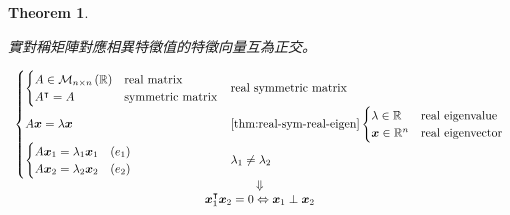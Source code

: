 \documentclass[
]{book}
\newtheorem{theorem}{Theorem}[chapter]
\theoremstyle{definition}
\theoremstyle{definition}
\theoremstyle{definition}
\theoremstyle{definition}
\theoremstyle{remark}
\begin{document}
\begin{theorem}
\protect\hypertarget{thm:unnamed-chunk-4}{}\label{thm:unnamed-chunk-4}\leavevmode

\begin{CJK}{UTF8}{bsmi}
實對稱矩陣對應相異特徵值的特徵向量互為正交。
\end{CJK}

\[
\begin{array}{c}
\begin{cases}
\begin{cases}
A\in\mathcal{M}_{n\times n}\left(\mathbb{R}\right) & \textup{real matrix}\\
A^{\intercal}=A & \textup{symmetric matrix}
\end{cases} & \textup{real symmetric matrix}\\
A\boldsymbol{x}=\lambda\boldsymbol{x} & \ref{thm:real-sym-real-eigen}\begin{cases}
\lambda\in\mathbb{R} & \textup{real eigenvalue}\\
\boldsymbol{x}\in\mathbb{R}^{n} & \textup{real eigenvector}
\end{cases}\\
\begin{cases}
A\boldsymbol{x}_{1}=\lambda_{1}\boldsymbol{x}_{1} & \left(e_{1}\right)\\
A\boldsymbol{x}_{2}=\lambda_{2}\boldsymbol{x}_{2} & \left(e_{2}\right)
\end{cases} & \lambda_{1}\ne\lambda_{2}
\end{cases}\\
\Downarrow\\
\boldsymbol{x}_{1}^{\intercal}\boldsymbol{x}_{2}=0\Leftrightarrow\boldsymbol{x}_{1}\perp\boldsymbol{x}_{2}
\end{array}
\]

\end{theorem}
\end{document}
